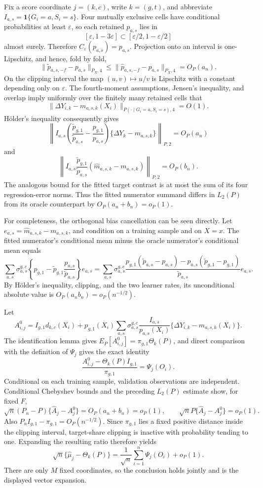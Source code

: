 Fix a score coordinate \(j=(k,c)\), write \(k=(g,t)\), and abbreviate \(I_{a,s}=\mathbf 1\{G_i=a,S_i=s\}\).  Four mutually exclusive cells have conditional probabilities at least \(\varepsilon\), so each retained \(p_{a,s}\) lies in
\[
 [\varepsilon,1-3\varepsilon]\subset[\varepsilon/2,1-\varepsilon/2]
\]
almost surely.  Therefore \(C_\varepsilon(p_{a,s})=p_{a,s}\).  Projection onto an interval is one-Lipschitz, and hence, fold by fold,
\[
 \|\widetilde p_{a,s,-f}-p_{a,s}\|_{P_X,4}
 \le \|\widehat p_{a,s,-f}-p_{a,s}\|_{P_X,4}=O_P(a_n).
\]
On the clipping interval the map \((u,v)\mapsto u/v\) is Lipschitz with a constant depending only on \(\varepsilon\).  The fourth-moment assumptions, Jensen's inequality, and overlap imply uniformly over the finitely many retained cells that
\[
 \|\Delta Y_{i,k}-m_{a,s,k}(X_i)\|_{P(\cdot\mid G_i=a,S_i=s),4}=O(1).
\]
H\"older's inequality consequently gives
\[
 \left\|I_{a,s}\left(
 \frac{\widetilde p_{g,1}}{\widetilde p_{a,s}}-
 \frac{p_{g,1}}{p_{a,s}}\right)
 \{\Delta Y_k-m_{a,s,k}\}\right\|_{P,2}=O_P(a_n)
\]
and
\[
 \left\|I_{a,s}\frac{\widetilde p_{g,1}}{\widetilde p_{a,s}}
 (\widehat m_{a,s,k}-m_{a,s,k})\right\|_{P,2}=O_P(b_n).
\]
The analogous bound for the fitted target contrast is at most the sum of its four regression-error norms.  Thus the fitted numerator summand differs in \(L_2(P)\) from its oracle counterpart by \(O_P(a_n+b_n)=o_P(1)\).

For completeness, the orthogonal bias cancellation can be seen directly.  Let \(e_{a,s}=\widehat m_{a,s,k}-m_{a,s,k}\), and condition on a training sample and on \(X=x\).  The fitted numerator's conditional mean minus the oracle numerator's conditional mean equals
\[
 \sum_{a,s}\sigma_{a,s}^{g,c}
 \left\{p_{g,1}-\widetilde p_{g,1}\frac{p_{a,s}}{\widetilde p_{a,s}}\right\}e_{a,s}
 =\sum_{a,s}\sigma_{a,s}^{g,c}
 \frac{p_{g,1}(\widetilde p_{a,s}-p_{a,s})
       -p_{a,s}(\widetilde p_{g,1}-p_{g,1})}
      {\widetilde p_{a,s}}e_{a,s}.
\]
By H\"older's inequality, clipping, and the two learner rates, its unconditional absolute value is \(O_P(a_nb_n)=o_P(n^{-1/2})\).

Let
\[
 A^0_{i,j}=I_{g,1}d_{k,c}(X_i)
 +p_{g,1}(X_i)\sum_{a,s}\sigma_{a,s}^{g,c}
 \frac{I_{a,s}}{p_{a,s}(X_i)}
 \{\Delta Y_{i,k}-m_{a,s,k}(X_i)\}.
\]
The identification lemma gives \(E_P[A^0_{i,j}]=\pi_{g,1}\Theta_k(P)\), and direct comparison with the definition of \(\Psi_j\) gives the exact identity
\[
 \frac{A^0_{i,j}-\Theta_k(P)I_{g,1}}{\pi_{g,1}}=\Psi_j(O_i).
\]
Conditional on each training sample, validation observations are independent.  Conditional Chebyshev bounds and the preceding \(L_2(P)\) estimate show, for fixed \(F\),
\[
 \sqrt n(P_n-P)\{\widehat A_j-A^0_j\}=O_P(a_n+b_n)=o_P(1),
 \qquad
 \sqrt nP\{\widehat A_j-A^0_j\}=o_P(1).
\]
Also \(P_nI_{g,1}-\pi_{g,1}=O_P(n^{-1/2})\).  Since \(\pi_{g,1}\) lies a fixed positive distance inside the clipping interval, target-share clipping is inactive with probability tending to one.  Expanding the resulting ratio therefore yields
\[
 \sqrt n\{\widehat\mu_j-\Theta_k(P)\}
 =\frac1{\sqrt n}\sum_{i=1}^n\Psi_j(O_i)+o_P(1).
\]
There are only \(M\) fixed coordinates, so the conclusion holds jointly and is the displayed vector expansion.

